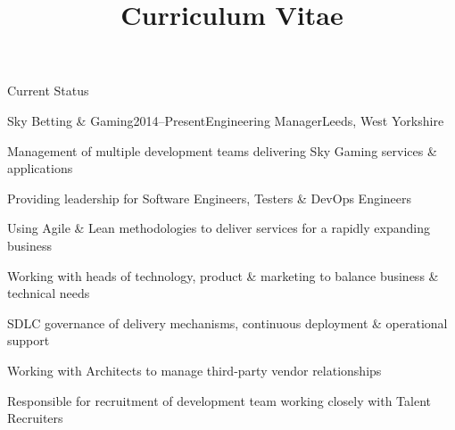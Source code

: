 \documentclass{cv}
\title{Curriculum Vitae}
\begin{document}

\begin{rSection}{Current Status}

\begin{rSubsection}{Sky Betting \& Gaming}{2014--Present}{Engineering Manager}{Leeds, West Yorkshire}
\item Management of multiple development teams delivering Sky Gaming services \& applications
\item Providing leadership for Software Engineers, Testers \& DevOps Engineers
\item Using Agile \& Lean methodologies to deliver services for a rapidly expanding business
\item Working with heads of technology, product \& marketing to balance business \& technical needs
\item SDLC governance of delivery mechanisms, continuous deployment \& operational support
\item Working with Architects to manage third-party vendor relationships
\item Responsible for recruitment of development team working closely with Talent Recruiters
\end{rSubsection}

\end{rSection}

\end{document}
